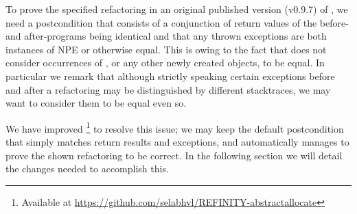 To prove the specified  refactoring in an original published version (v0.9.7) of \Refinity{}, we need a postcondition that consists of a conjunction of return values of the before- and after-programs being identical and
that any thrown exceptions are both instances of NPE or otherwise equal.
This is owing to the fact that \Refinity{} does not consider occurrences of , or any other newly created objects, to be equal.
In particular we remark that although strictly speaking certain exceptions before and after a refactoring may be distinguished by different stacktraces, we may want to consider them to be equal even so.

We have improved  \Refinity{}\footnote{Available at \footnotesize \url{https://github.com/selabhvl/REFINITY-abstractallocate}} to resolve this issue; we may keep the default postcondition that simply matches return results and exceptions, and
\Refinity{} automatically manages to prove the shown  refactoring to be correct.
In the following section we will detail the changes needed to accomplish this.

